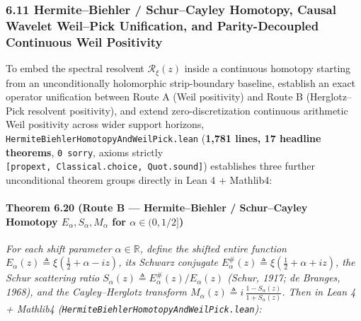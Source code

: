 \documentclass[
  11pt,
]{article}
\begin{document}
\subsubsection{6.11 Hermite--Biehler / Schur--Cayley Homotopy, Causal
Wavelet Weil--Pick Unification, and Parity-Decoupled Continuous Weil
Positivity}\label{hermitebiehler-schurcayley-homotopy-causal-wavelet-weilpick-unification-and-parity-decoupled-continuous-weil-positivity}

To embed the spectral resolvent \(\mathcal{R}_\xi(z)\) inside a
continuous homotopy starting from an unconditionally holomorphic
strip-boundary baseline, establish an exact operator unification between
Route A (Weil positivity) and Route B (Herglotz--Pick resolvent
positivity), and extend zero-discretization continuous arithmetic Weil
positivity across wider support horizons,
\texttt{HermiteBiehlerHomotopyAndWeilPick.lean} (\textbf{1,781 lines, 17
headline theorems}, \texttt{0\ sorry}, axioms strictly
\texttt{{[}propext,\ Classical.choice,\ Quot.sound{]}}) establishes
three further unconditional theorem groups directly in Lean 4 +
Mathlib4:

\paragraph{\texorpdfstring{Theorem 6.20 (Route B --- Hermite--Biehler /
Schur--Cayley Homotopy \(E_\alpha, S_\alpha, M_\alpha\) for
\(\alpha \in (0, 1/2]\))}{Theorem 6.20 (Route B --- Hermite--Biehler / Schur--Cayley Homotopy E\_\textbackslash alpha, S\_\textbackslash alpha, M\_\textbackslash alpha for \textbackslash alpha \textbackslash in (0, 1/2{]})}}\label{theorem-6.20-route-b-hermitebiehler-schurcayley-homotopy-e_alpha-s_alpha-m_alpha-for-alpha-in-0-12}

\emph{For each shift parameter \(\alpha \in \mathbb{R}\), define the
shifted entire function
\(E_\alpha(z) \triangleq \xi(\frac{1}{2} + \alpha - iz)\), its Schwarz
conjugate
\(E_\alpha^{\#}(z) \triangleq \xi(\frac{1}{2} + \alpha + iz)\), the
Schur scattering ratio
\(S_\alpha(z) \triangleq E_\alpha^{\#}(z)/E_\alpha(z)\) (Schur, 1917; de
Branges, 1968), and the Cayley--Herglotz transform
\(M_\alpha(z) \triangleq i\,\frac{1 - S_\alpha(z)}{1 + S_\alpha(z)}\).
Then in Lean 4 + Mathlib4
(\texttt{HermiteBiehlerHomotopyAndWeilPick.lean}):}
\end{document}
